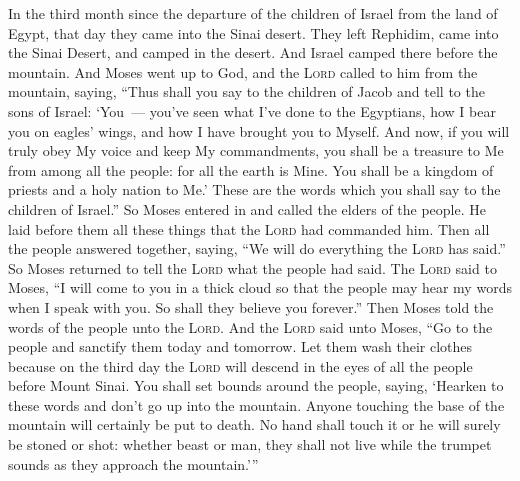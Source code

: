 
\begin{inparaenum}
   In the third month since the departure of the children of Israel from the land of Egypt, that day they came into the Sinai desert.%
   They left Rephidim, came into the Sinai Desert, and camped in the desert. And Israel camped there before the mountain.%
   And Moses went up to God, and the \textsc{Lord} called to him from the mountain, saying, ``Thus shall you say to the children of Jacob and tell to the sons of Israel:%
   `You~--- you've seen what I've done to the Egyptians, how I bear you on eagles' wings, and how I have brought you to Myself.%
   And now, if you will truly obey My voice and keep My commandments, you shall be a treasure to Me from among all the people: for all the earth is Mine.%
   You shall be a kingdom of priests and a holy nation to Me.' These are the words which you shall say to the children of Israel.''%
   So Moses entered in and called the elders of the people. He laid before them all these things that the \textsc{Lord} had commanded him.%
   Then all the people answered together, saying, ``We will do everything the \textsc{Lord} has said.'' So Moses returned to tell the \textsc{Lord} what the people had said.%
   The \textsc{Lord} said to Moses, ``I will come to you in a thick cloud so that the people may hear my words when I speak with you. So shall they believe you forever.'' Then Moses told the words of the people unto the \textsc{Lord}.%
   And the \textsc{Lord} said unto Moses, ``Go to the people and sanctify them today and tomorrow. Let them wash their clothes%
   because on the third day the \textsc{Lord} will descend in the eyes of all the people before Mount Sinai.%
   You shall set bounds around the people, saying, `Hearken to these words and don't go up into the mountain. Anyone touching the base of the mountain will certainly be put to death.%
   No hand shall touch it or he will surely be stoned or shot: whether beast or man, they shall not live while the trumpet sounds as they approach the mountain.'\thinspace''%

\end{inparaenum}
